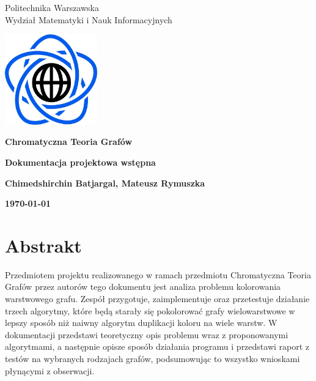 \documentclass[10pt,a4paper]{article}
\begin{document}
	\begin{titlepage}
		\begin{center}
			{\fontsize{14}{12}\selectfont Politechnika Warszawska \\ Wydział Matematyki i Nauk Informacyjnych}
			
		\end{center}
		
		\vspace{1cm}
		\begin{center}
			\includegraphics[width=0.3\textwidth]{images/logo.png}
		\end{center}
		\vspace{3cm}
		
		\begin{center}
			\textbf{{\fontsize{26}{12}\selectfont Chromatyczna Teoria Grafów}}
			
			\vspace{2cm}
			\textbf{{\fontsize{22}{12}\selectfont Dokumentacja projektowa wstępna}}
			\vspace{1cm}
			
			\textbf{{\fontsize{13.5}{12}\selectfont Chimedshirchin Batjargal, Mateusz Rymuszka}}
			
			\vspace{6cm}
			\textbf{{\fontsize{13.5}{12}\selectfont \today}}
		\end{center}  
	\end{titlepage}
	
	{\fontsize{13.5}{12}\selectfont
		\tableofcontents
		\vspace{1cm}
		{\renewcommand{\arraystretch}{2.0}
		
	}}
	
	
	\section{Abstrakt}
	
	Przedmiotem projektu realizowanego w ramach przedmiotu Chromatyczna Teoria Grafów przez autorów tego dokumentu jest analiza problemu kolorowania warstwowego grafu. Zespół przygotuje, zaimplementuje oraz przetestuje działanie trzech algorytmy, które będą starały się pokolorować grafy wielowarstwowe w lepszy sposób niż naiwny algorytm duplikacji koloru na wiele warstw. W dokumentacji przedstawi teoretyczny opis problemu wraz z proponowanymi algorytmami, a następnie opisze sposób działania programu i przedstawi raport z testów na wybranych rodzajach grafów, podsumowując to wszystko wnioskami płynącymi z obserwacji.
	
\end{document}

